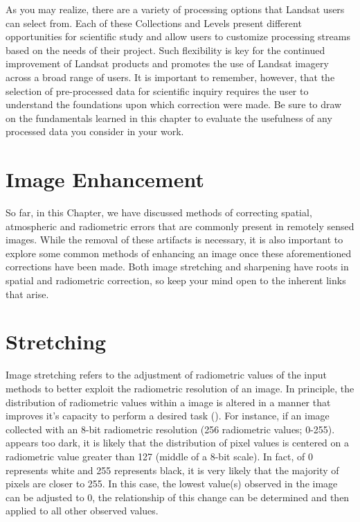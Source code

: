 \documentclass[
]{book}
\begin{document}
As you may realize, there are a variety of processing options that
Landsat users can select from. Each of these Collections and Levels
present different opportunities for scientific study and allow users to
customize processing streams based on the needs of their project. Such
flexibility is key for the continued improvement of Landsat products and
promotes the use of Landsat imagery across a broad range of users. It is
important to remember, however, that the selection of pre-processed data
for scientific inquiry requires the user to understand the foundations
upon which correction were made. Be sure to draw on the fundamentals
learned in this chapter to evaluate the usefulness of any processed data
you consider in your work.

\hypertarget{image-enhancement}{%
\section{Image Enhancement}\label{image-enhancement}}

So far, in this Chapter, we have discussed methods of correcting
spatial, atmospheric and radiometric errors that are commonly present in
remotely sensed images. While the removal of these artifacts is
necessary, it is also important to explore some common methods of
enhancing an image once these aforementioned corrections have been made.
Both image stretching and sharpening have roots in spatial and
radiometric correction, so keep your mind open to the inherent links
that arise.

\hypertarget{stretching}{%
\section{Stretching}\label{stretching}}

Image stretching refers to the adjustment of radiometric values of the
input methods to better exploit the radiometric resolution of an image.
In principle, the distribution of radiometric values within a image is
altered in a manner that improves it's capacity to perform a desired
task (). For instance, if an image collected with an 8-bit radiometric
resolution (256 radiometric values; 0-255). appears too dark, it is
likely that the distribution of pixel values is centered on a
radiometric value greater than 127 (middle of a 8-bit scale). In fact,
of 0 represents white and 255 represents black, it is very likely that
the majority of pixels are closer to 255. In this case, the lowest
value(s) observed in the image can be adjusted to 0, the relationship of
this change can be determined and then applied to all other observed
values.
\end{document}
